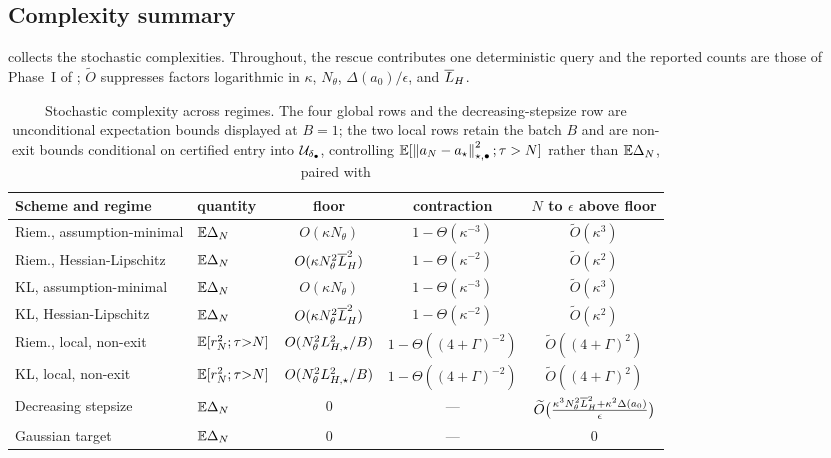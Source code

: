 \subsection{Complexity summary}
\label{subsec:stoch-summary}

 collects the stochastic complexities. Throughout, the rescue contributes one
deterministic query and the reported counts are those of Phase~I of ; $\widetilde O$
suppresses factors logarithmic in $\kappa$, $N_\theta$, $\Delta(a_0)/\epsilon$, and $\overline{L}_H$.

\begin{table}[t]
\centering
\footnotesize
\begin{tabular}{llccc}
\hline
Scheme and regime & quantity & floor & contraction & $N$ to $\epsilon$ above floor \\
\hline
Riem., assumption-minimal & $\mathbb{E}\Delta_N$ & $O(\kappa N_\theta)$ & $1-\Theta(\kappa^{-3})$ & $\widetilde O(\kappa^3)$ \\
Riem., Hessian-Lipschitz & $\mathbb{E}\Delta_N$ & $O(\kappa N_\theta^2\overline{L}_H^2)$ & $1-\Theta(\kappa^{-2})$ & $\widetilde O(\kappa^2)$ \\
KL, assumption-minimal & $\mathbb{E}\Delta_N$ & $O(\kappa N_\theta)$ & $1-\Theta(\kappa^{-3})$ & $\widetilde O(\kappa^3)$ \\
KL, Hessian-Lipschitz & $\mathbb{E}\Delta_N$ & $O(\kappa N_\theta^2\overline{L}_H^2)$ & $1-\Theta(\kappa^{-2})$ & $\widetilde O(\kappa^2)$ \\
\hline
Riem., local, non-exit & $\mathbb{E}[r_N^2;\tau{>}N]$ & $O(N_\theta^2L_{H,\star}^2/B)$ & $1-\Theta((4{+}\Gamma)^{-2})$ & $\widetilde O((4{+}\Gamma)^2)$ \\
KL, local, non-exit & $\mathbb{E}[r_N^2;\tau{>}N]$ & $O(N_\theta^2L_{H,\star}^2/B)$ & $1-\Theta((4{+}\Gamma)^{-2})$ & $\widetilde O((4{+}\Gamma)^2)$ \\
\hline
Decreasing stepsize & $\mathbb{E}\Delta_N$ & $0$ & --- & $\widetilde O\bigl(\tfrac{\kappa^3N_\theta^2\overline{L}_H^2+\kappa^2\Delta(a_0)}\epsilon\bigr)$ \\
Gaussian target & $\mathbb{E}\Delta_N$ & $0$ & --- & $0$ \\
\hline
\end{tabular}
\caption{Stochastic complexity across regimes. The four global rows and the decreasing-stepsize row
are unconditional expectation bounds displayed at $B=1$; the two local rows retain the batch $B$ and
are non-exit bounds conditional on certified entry into $\mathcal{U}_{\delta_\bullet}$, controlling
$\mathbb{E}[\left\lVert a_N-a_\star\right\rVert_{\star,\bullet}^2;\tau>N]$ rather than $\mathbb{E}\Delta_N$, paired with
}
\end{table}
